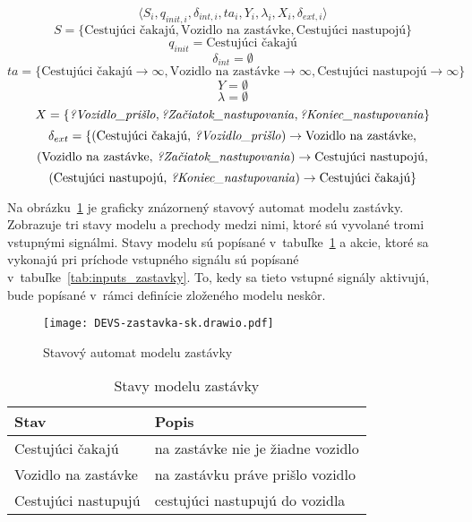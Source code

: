 \[\langle S_i, q_{init,i}, {\delta}_{int,i}, ta_i, Y_i, {\lambda}_i, X_i, {\delta}_{ext,i} \rangle\]
\[S = \{\text{Cestujúci čakajú}, \text{Vozidlo na zastávke}, \text{Cestujúci nastupojú} \}\]
\[q_{init} = \text{Cestujúci čakajú}\]
\[\delta_{int} = \emptyset\]
\[ta = \{ \text{Cestujúci čakajú} \rightarrow \infty, \text{Vozidlo na zastávke} \rightarrow \infty, \text{Cestujúci nastupojú} \rightarrow \infty \}\]
\[Y = \emptyset\]
\[\lambda = \emptyset\]
\[X = \{\text{\textit{?Vozidlo\_prišlo}}, \text{\textit{?Začiatok\_nastupovania}}, \text{\textit{?Koniec\_nastupovania}} \}\]
\[\delta_{ext} = \{ (\text{Cestujúci čakajú, \textit{?Vozidlo\_prišlo}}) \rightarrow \text{Vozidlo na zastávke},\]
\[(\text{Vozidlo na zastávke, \textit{?Začiatok\_nastupovania}}) \rightarrow \text{Cestujúci nastupojú},\]
\[(\text{Cestujúci nastupojú, \textit{?Koniec\_nastupovania}}) \rightarrow \text{Cestujúci čakajú} \}\]

Na obrázku~\ref{fig:model_zastavky} je graficky znázornený stavový automat modelu zastávky.
Zobrazuje tri stavy modelu a prechody medzi nimi, ktoré sú vyvolané tromi vstupnými signálmi.
Stavy modelu sú popísané v~tabuľke~\ref{tab:stavy_zastavky} a akcie, ktoré sa vykonajú pri príchode vstupného signálu sú popísané v~tabuľke~\ref{tab:inputs_zastavky}.
To, kedy sa tieto vstupné signály aktivujú, bude popísané v~rámci definície zloženého modelu neskôr.

\begin{figure}[h]\label{fig:model_zastavky}
  \centering
  \texttt{[image: DEVS-zastavka-sk.drawio.pdf]}
  \caption{Stavový automat modelu zastávky}
\end{figure}

\begin{table}[h]\label{tab:stavy_zastavky}
  \centering
  \begin{tabularx}{\textwidth}{|l|X|}
    \hline
    \textbf{Stav} & \textbf{Popis} \\ \hline
    Cestujúci čakajú & na zastávke nie je žiadne vozidlo \\ \hline
    Vozidlo na zastávke & na zastávku práve prišlo vozidlo \\ \hline
    Cestujúci nastupujú & cestujúci nastupujú do vozidla \\ \hline
  \end{tabularx}
  \caption{Stavy modelu zastávky}
\end{table}

